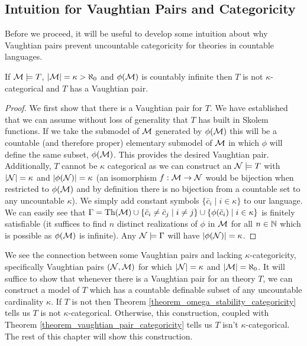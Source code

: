 \subsection{Intuition for Vaughtian Pairs and Categoricity}

Before we proceed, it will be useful to develop some intuition about why Vaughtian pairs prevent uncountable categoricity for theories in countable languages.

\begin{theorem}\label{theorem_vaughtian_pair_categoricity}
If \(\mathcal{M} \models T\), \(|\mathcal{M}| = \kappa > \aleph_0\) and \(\phi(\mathcal{M})\) is countably infinite then \(T\) is not \(\kappa\)-categorical and \(T\) has a Vaughtian pair. 
\end{theorem}

\begin{proof}
We first show that there is a Vaughtian pair for \(T\).
We have established that we can assume without loss of generality that \(T\) has built in Skolem functions. 
If we take the submodel of \(\mathcal{M}\) generated by \(\phi(\mathcal{M})\) this will be a countable (and therefore proper) elementary submodel of \(\mathcal{M}\) in which \(\phi\) will define the same subset, \(\phi(\mathcal{M})\).
This provides the desired Vaughtian pair. 
Additionally, \(T\) cannot be \(\kappa\) categorical as we can construct an \(\mathcal{N} \models T\) with \(|\mathcal{N}| = \kappa\) and \(|\phi(\mathcal{N})| = \kappa\) (an isomorphism \(f: \mathcal{M} \to \mathcal{N}\) would be bijection when restricted to \(\phi(\mathcal{M})\) and by definition there is no bijection from a countable set to any uncountable \(\kappa\)).
We simply add constant symbols \(\{\bar{c}_i \mid i \in \kappa\}\) to our language. 
We can easily see that \(\Gamma = \text{Th}(\mathcal{M}) \cup \{\bar{c}_i \neq \bar{c}_j \mid i \neq j\} \cup \{\phi(\bar{c}_i) \mid i \in \kappa\}\) is finitely satisfiable (it suffices to find \(n\) distinct realizations of \(\phi\) in \(\mathcal{M}\) for all \(n \in \mathbb{N}\) which is possible as \(\phi(\mathcal{M})\) is infinite). 
Any \(\mathcal{N} \models \Gamma\) will have \(|\phi(\mathcal{N})| = \kappa\). 
\end{proof}

We see the connection between some Vaughtian pairs and lacking \(\kappa\)-categoricity, specifically Vaughtian pairs \((\mathcal{N}, \mathcal{M})\) for which \(|\mathcal{N}| = \kappa\) and \(|\mathcal{M}| = \aleph_0\).
It will suffice to show that whenever there is a Vaughtian pair for an \omst theory \(T\), we can construct a model of \(T\) which has a countable definable subset of any uncountable cardinality \(\kappa\). 
If \(T\) is not \omst then Theorem \ref{theorem_omega_stability_categoricity} tells us \(T\) is not \(\kappa\)-categorical.
Otherwise, this construction, coupled with Theorem \ref{theorem_vaughtian_pair_categoricity} tells us \(T\) isn't \(\kappa\)-categorical.
The rest of this chapter will show this construction. 

